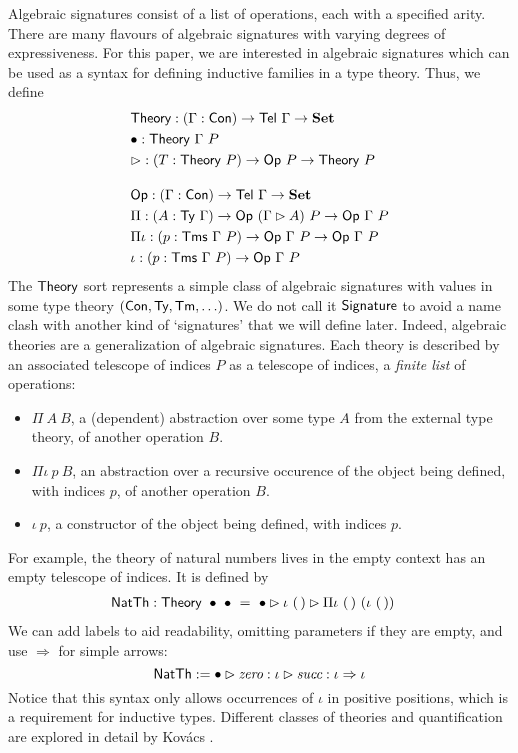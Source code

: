 Algebraic signatures consist of a list of operations, each with a specified
arity. There are many flavours of algebraic signatures with varying degrees of
expressiveness. For this paper, we are interested in algebraic signatures which can
be used as a syntax for defining inductive families in a type theory. Thus, we define
\begin{align*}
    &\mta{Theory} : (\Gamma : \Con) \to \mta{Tel}\ \Gamma \to \Set \\
    &\bullet : \mta{Theory}\ \Gamma\ P \\
    &\rhd : (T : \mta{Theory}\ P) \to \mta{Op}\ P \to \mta{Theory}\ P \\[1em]
    &\mta{Op} : (\Gamma : \Con) \to \mta{Tel}\ \Gamma \to \Set \\
    &\Pi : (A : \Ty\ \Gamma) \to \mta{Op}\ (\Gamma \rhd A)\ P \to \mta{Op}\ \Gamma\ P \\
    &\Pi\iota : (p : \Tms\ \Gamma\ P) \to \mta{Op}\ \Gamma\ P \to \mta{Op}\ \Gamma\ P \\
    &\iota : (p : \Tms\ \Gamma\ P) \to \mta{Op}\ \Gamma\ P
\end{align*}
The $\textsf{Theory}$ sort represents a simple class of algebraic signatures with
values in some type theory $(\textsf{Con}, \textsf{Ty}, \textsf{Tm}, \ldots)$. We do not
call it $\textsf{Signature}$ to avoid a name clash with another kind of
`signatures' that we will define later. Indeed, algebraic theories \cite{Adamek2010-ls} are a
generalization of algebraic signatures. Each theory is described by an associated telescope
of indices $P$ as a telescope of indices,  a \emph{finite list} of operations:
\begin{itemize}
    \item $\Pi\ A\ B$, a (dependent) abstraction over some type $A$ from the
    external type theory, of another operation $B$. \item $\Pi\iota\ p\ B$, an
    abstraction over a recursive occurence of
    the object being defined, with indices $p$, of another operation
    $B$.
    \item $\iota\ p$, a constructor of the object being defined, with indices $p$.
\end{itemize}
For example, the theory of natural numbers lives in the empty context has an
empty telescope of indices. It is defined by
\begin{align*}
	&\textsf{NatTh} : \textsf{Theory}\ \bullet\ \bullet\ =\ \bullet \rhd \iota\ (\,) \rhd \Pi\iota\ (\,)\ (\iota\ (\,))
\end{align*}
We can add labels to aid readability, omitting parameters
if they are empty, and use $\Rightarrow$ for simple arrows:
\[
\textsf{NatTh} := \bullet \rhd \textit{zero} : \iota \rhd \textit{succ} : \iota \Rightarrow \iota
\]
Notice that this syntax only allows occurrences of $\iota$ in positive
positions, which is a requirement for inductive types.
Different classes of theories and quantification are explored in detail by
Kov\'acs \cite{Kovacs2023-gq}.

